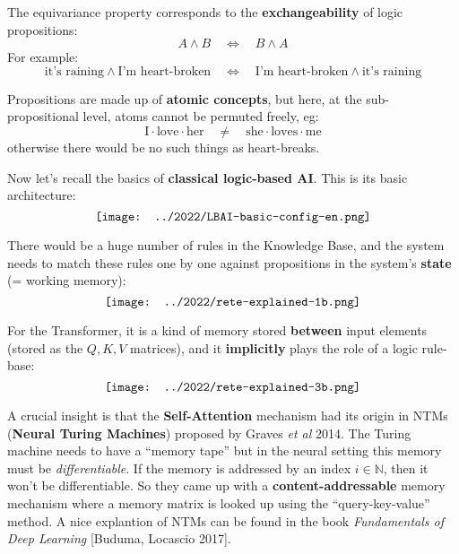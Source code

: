 \begin{preview}
\begin{minipage}{\textwidth}
The equivariance property corresponds to the \textbf{exchangeability} of logic propositions:
\begin{equation}
A \wedge B \quad \Leftrightarrow \quad B \wedge A
\end{equation}
For example:
\begin{equation}
\mbox{it's raining} \wedge \mbox{I'm heart-broken} \quad \Leftrightarrow \quad \mbox{I'm heart-broken} \wedge \mbox{it's raining}
\end{equation}

Propositions are made up of \textbf{atomic concepts}, but here, at the sub-propositional level, atoms cannot be permuted freely, eg:
\begin{equation}
\mbox{I} \cdot \mbox{love} \cdot \mbox{her} \quad \neq \quad \mbox{she} \cdot \mbox{loves} \cdot \mbox{me}
\end{equation}
otherwise there would be no such things as heart-breaks.

Now let's recall the basics of \textbf{classical logic-based AI}.  This is its basic architecture:
\begin{equation}
\vcenter{\hbox{\texttt{[image: ../2022/LBAI-basic-config-en.png]}}}
\end{equation}

There would be a huge number of rules in the Knowledge Base, and the system needs to match these rules one by one against propositions in the system's \textbf{state} (= working memory):
\begin{equation}
\vcenter{\hbox{\texttt{[image: ../2022/rete-explained-1b.png]}}}
\end{equation}

For the Transformer, it is a kind of memory stored \textbf{between} input elements (stored as the $Q, K, V$ matrices), and it \textbf{implicitly} plays the role of a logic rule-base:
\begin{equation}
\label{fig:self-attention-as-Rete}
\vcenter{\hbox{\texttt{[image: ../2022/rete-explained-3b.png]}}}
\end{equation}

A crucial insight is that the \textbf{Self-Attention} mechanism had its origin in NTMs (\textbf{Neural Turing Machines}) proposed by Graves \textit{et al} 2014.  The Turing machine needs to have a ``memory tape'' but in the neural setting this memory must be \textit{differentiable}.  If the memory is addressed by an index $i \in \mathbb{N}$, then it won't be differentiable.  So they came up with a \textbf{content-addressable} memory mechanism where a memory matrix is looked up using the ``query-key-value'' method.  A nice explantion of NTMs can be found in the book \textit{Fundamentals of Deep Learning} [Buduma, Locascio 2017].


\end{minipage}
\end{preview}
